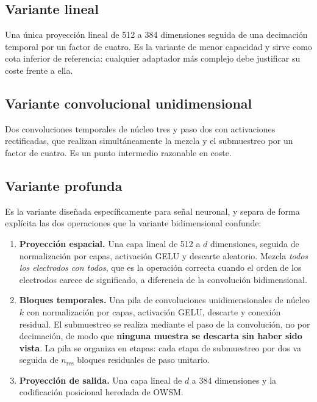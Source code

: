 \subsection{Variante lineal}

Una única proyección lineal de 512 a 384 dimensiones seguida de una decimación temporal por un factor de cuatro. Es la variante de menor capacidad y sirve como cota inferior de referencia: cualquier adaptador más complejo debe justificar su coste frente a ella.

\subsection{Variante convolucional unidimensional}

Dos convoluciones temporales de núcleo tres y paso dos con activaciones rectificadas, que realizan simultáneamente la mezcla y el submuestreo por un factor de cuatro. Es un punto intermedio razonable en coste.

\subsection{Variante profunda}
\label{sec:frontend-deep}

Es la variante diseñada específicamente para señal neuronal, y separa de forma explícita las dos operaciones que la variante bidimensional confunde:

\begin{enumerate}[leftmargin=*, itemsep=0.3em]
  \item \textbf{Proyección espacial.} Una capa lineal de 512 a $d$ dimensiones, seguida de normalización por capas, activación GELU y descarte aleatorio. Mezcla \textit{todos los electrodos con todos}, que es la operación correcta cuando el orden de los electrodos carece de significado, a diferencia de la convolución bidimensional.
  \item \textbf{Bloques temporales.} Una pila de convoluciones unidimensionales de núcleo $k$ con normalización por capas, activación GELU, descarte y conexión residual. El submuestreo se realiza mediante el paso de la convolución, no por decimación, de modo que \textbf{ninguna muestra se descarta sin haber sido vista}. La pila se organiza en etapas: cada etapa de submuestreo por dos va seguida de $n_{\mathrm{res}}$ bloques residuales de paso unitario.
  \item \textbf{Proyección de salida.} Una capa lineal de $d$ a 384 dimensiones y la codificación posicional heredada de OWSM.
\end{enumerate}

